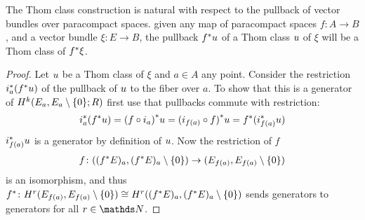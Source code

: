 \begin{Cor}
  The Thom class construction is natural with respect to the pullback
  of vector bundles over paracompact spaces.
  \Idest given any map of paracompact spaces $f\colon A\to B$, and a
  vector bundle $\xi\colon E\to B$,
  the pullback ${f}^* u$ of a Thom class $u$ of $\xi$ will
  be a Thom class of ${f}^* \xi$.
  \begin{proof}
    Let $u$ be a Thom class of $\xi$ and $a\in A$ any point.
    Consider the restriction ${i}^*_a({f}^* u)$
    of the pullback of $u$ to the fiber over $a$. To show that this
    is a generator of $H^{k}(E_a, {E_a}\setminus\{0\};R)$ first use that
    pullbacks commute with restriction:
    \begin{gather*}
      {i}^*_a({f}^* u)
      = {(f\circ i_a)}^* u
      = {(i_{f(a)}\circ f)}^* u
      = {f}^* ({i}^*_{f(a)} u)
    \end{gather*}
    ${i}^*_{f(a)} u$ is a generator by definition of $u$.
    Now the restriction of $f$
    \begin{gather*}
      f\colon (({f}^* E)_a, {({f}^* E)_a}\setminus\{0\}) \to (E_{f(a)}, {E_{f(a)}}\setminus\{0\})
    \end{gather*}
    is an isomorphism, and thus
    ${f}^*\colon H^r(E_{f(a)}, {E_{f(a)}}\setminus\{0\})
    \cong H^r(({f}^* E)_a, {({f}^* E)_a}\setminus\{0\})$
    sends generators to generators for all $r\in\Nat$.
  \end{proof}
\end{Cor}

